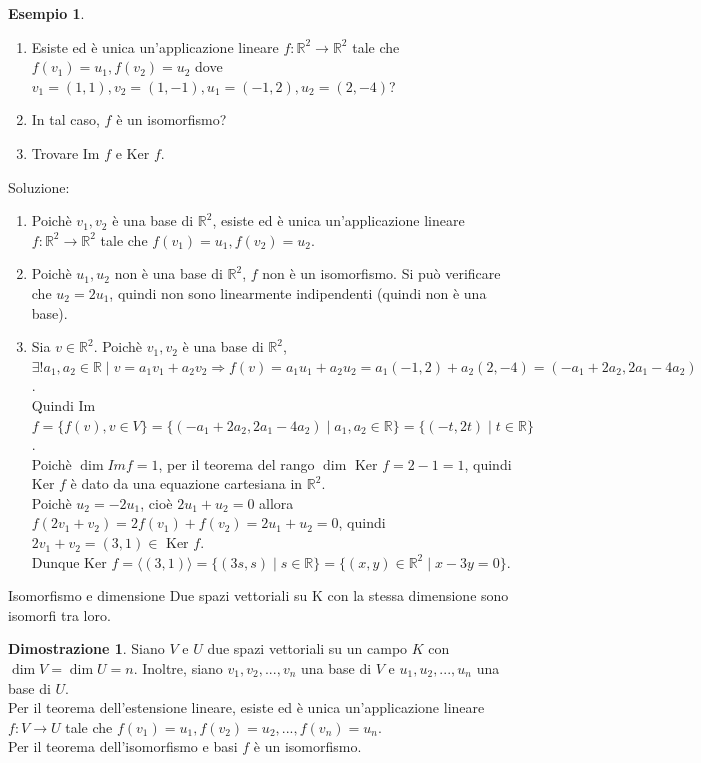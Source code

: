 \documentclass[a4paper]{article}
\theoremstyle{definition}
\newtheorem*{dimm}{Dimostrazione}
\newtheorem*{es}{Esempio}
\begin{document}
\begin{es}
	\begin{enumerate}
		\item Esiste ed è unica un'applicazione lineare $f: \mathbb{R}^2 \rightarrow \mathbb{R}^2$ tale che $f(v_1) = u_1, f(v_2) = u_2$ dove $v_1 = (1, 1), v_2 = (1, -1), u_1 = (-1, 2), u_2 = (2, -4)$?
		\item In tal caso, $f$ è un isomorfismo?
		\item Trovare Im $f$ e Ker $f$.
	\end{enumerate}
	Soluzione:
	\begin{enumerate}
		\item Poichè $v_1, v_2$ è una base di $\mathbb{R}^2$, esiste ed è unica un'applicazione lineare $f: \mathbb{R}^2 \rightarrow \mathbb{R}^2$ tale che $f(v_1) = u_1, f(v_2) = u_2$.
		\item Poichè $u_1, u_2$ non è una base di $\mathbb{R}^2$, $f$ non è un isomorfismo. Si può verificare che $u_2 = 2u_1$, quindi non sono linearmente indipendenti (quindi non è una base).
		\item Sia $v \in \mathbb{R}^2$. Poichè $v_1, v_2$ è una base di $\mathbb{R}^2$, $\exists! a_1, a_2 \in \mathbb{R} \mid v = a_1v_1 + a_2v_2 \Rightarrow f(v) = a_1u_1 + a_2u_2 = a_1(-1, 2) + a_2(2, -4) = (-a_1 + 2a_2, 2a_1 - 4a_2)$. \\
		      Quindi Im $f = \{f(v), v \in V\} = \{(-a_1 + 2a_2, 2a_1 - 4a_2) \mid a_1, a_2 \in \mathbb{R}\} = \{(-t, 2t) \mid t \in \mathbb{R}\}$. \\
		      Poichè $\dim Im f = 1$, per il teorema del rango $\dim$ Ker $f = 2 - 1 = 1$, quindi Ker $f$ è dato da una equazione cartesiana in $\mathbb{R}^2$. \\
		      Poichè $u_2 = -2u_1$, cioè $2u_1 + u_2 = 0$ allora $f(2v_1 + v_2) = 2f(v_1) + f(v_2) = 2u_1 + u_2 = 0$, quindi $2v_1 + v_2 = (3, 1) \in$ Ker $f$. \\
		      Dunque Ker $f = \langle (3, 1) \rangle = \{(3s, s) \mid s \in \mathbb{R}\} = \{(x, y) \in \mathbb{R}^2 \mid x - 3y = 0\}$.
	\end{enumerate}
\end{es}

\begin{cor}{Isomorfismo e dimensione}{}
	Due spazi vettoriali su K con la stessa dimensione sono isomorfi tra loro.
\end{cor}
\begin{dimm}
	Siano $V$ e $U$ due spazi vettoriali su un campo $K$ con $\dim V = \dim U = n$.
	Inoltre, siano $v_1, v_2, ..., v_n$ una base di $V$ e $u_1, u_2, ..., u_n$ una base di $U$. \\
	Per il teorema dell'estensione lineare, esiste ed è unica un'applicazione lineare $f: V \rightarrow U$ tale che $f(v_1) = u_1, f(v_2) = u_2, ..., f(v_n) = u_n$. \\
	Per il teorema dell'isomorfismo e basi $f$ è un isomorfismo.
\end{dimm}
\end{document}
